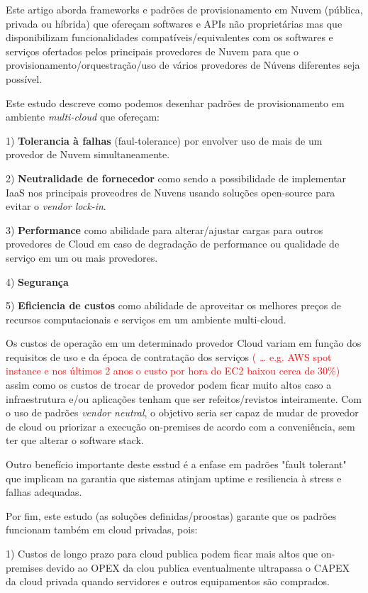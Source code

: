 \documentclass[12pt]{article}
\begin{document}
		Este artigo aborda frameworks e padrões de provisionamento em Nuvem (pública, privada ou híbrida) que ofereçam softwares e APIs não proprietárias mas que disponibilizam funcionalidades compatíveis/equivalentes com os softwares e serviços ofertados pelos principais provedores de Nuvem para que o provisionamento/orquestração/uso de vários provedores de Núvens diferentes seja possível.
		
		Este estudo descreve como podemos desenhar padrões de provisionamento em ambiente \textit{multi-cloud} que ofereçam:
		
		1) \textbf{Tolerancia à falhas} (faul-tolerance) por envolver uso de mais de um provedor de Nuvem simultaneamente.
		
		2) \textbf{Neutralidade de fornecedor} como sendo a possibilidade de implementar IaaS nos principais proveodres de Nuvens usando soluções open-source para evitar o \textit{vendor lock-in}.
		
		3) \textbf{Performance} como abilidade para alterar/ajustar cargas para outros provedores de Cloud em caso de degradação de performance ou qualidade de serviço em um ou mais provedores.
		
		4) \textbf{Segurança}
		
		5) \textbf{Eficiencia de custos} como abilidade de aproveitar os melhores preços de recursos computacionais e serviços em um ambiente multi-cloud.
		
		Os custos de operação em um determinado provedor Cloud variam em função dos requisitos de uso e da época de contratação dos serviços \textcolor{red}{( … e.g. AWS spot instance e nos últimos 2 anos o custo por hora do EC2 baixou cerca de 30\%)} assim como os custos de trocar de provedor podem ficar muito altos caso a infraestrutura e/ou aplicações tenham que ser refeitos/revistos inteiramente. Com o uso de padrões \textit{vendor neutral}, o objetivo seria ser capaz de mudar de provedor de cloud ou priorizar a execução on-premises de acordo com a conveniência, sem ter que alterar o software stack.
		
		Outro benefício importante deste esstud é a enfase em padrões "fault tolerant" que implicam na garantia que sistemas atinjam uptime e resiliencia à stress e falhas adequadas. 
		
		Por fim, este estudo (as soluções definidas/proostas) garante que os padrões funcionam também em cloud privadas, pois:
		
		1) Custos de longo prazo para cloud publica podem ficar mais altos que on-premises devido ao OPEX da clou publica eventualmente ultrapassa o CAPEX da cloud privada quando servidores e outros equipamentos são comprados.
		
\end{document}
